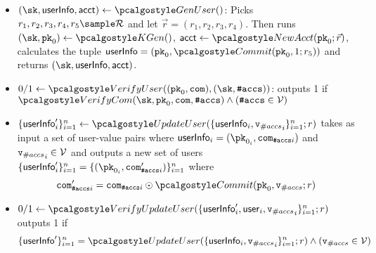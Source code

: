 \begin{itemize}
    \item $(\sk, \userinfo, \acct) \gets \genuser()$: Picks $r_1, r_2, r_3, r_4, r_5 \sample \randspace$ and let $\vec{r} = (r_1, r_2, r_3, r_4)$. Then runs $(\sk, \inpk)\gets \kgen()$, $\acct \gets \newacc(\inpk; \vec{r})$, calculates the tuple $\userinfo = (\inpk, \commit(\inpk, 1;r_5))$  and returns
    $(\sk, \userinfo, \acct)$.
    
    \item  $0/1 \gets \veruser((\inpk, \com), (\sk, \numaccs))$: outputs 1 if 
   $
        \vercom(\sk, \inpk, \com, \numaccs)
        \land (\numaccs \in \vset)
    $

    \item $\{\userinfo'_i\}_{i=1}^n \gets \upduser(\{\userinfo_i, {\vnumaccs}_i\}_{i=1}^n; r)$ takes as input a set of user-value pairs where $\userinfo_i = (\pk_{0_i},\com_{\numaccs i})$ and ${\textup{\texttt{{v}}}_{\#accs}}_i \in \mathcal{V}$ and outputs a new set of users $\{\userinfo'_{i}\}_{i=1}^n = \{(\pk_{0_i}, \com_{\numaccs i}^\prime)\}_{i=1}^n$ 
    where 
    \begin{equation*}
        \com_{\numaccs i}^\prime = \com_{\numaccs i} \odot \commit(\inpk, \vnumaccs;r)
    \end{equation*}

    \item $0/1 \gets \verupduser(\{\userinfo'_i, \user_i, {\vnumaccs}_i\}_{i=1}^n; r)$ outputs 1 if
    \begin{equation*}
        \{\userinfo'\}_{i=1}^n = \upduser(\{\userinfo_i, {\vnumaccs}_i\}_{i=1}^n; r) \land (\vnumaccs \in \vset)
    \end{equation*}
\end{itemize}